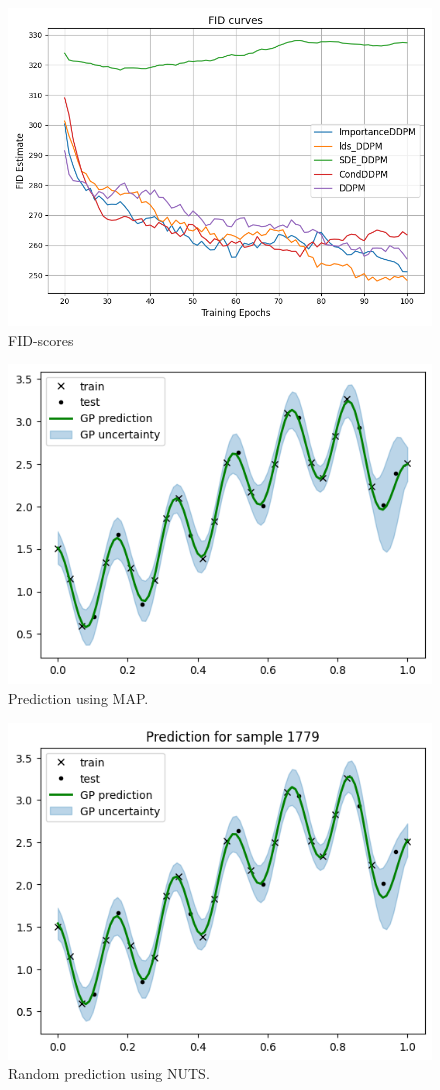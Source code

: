 \begin{figure}[H]
    \centering
    \includegraphics[width=0.9\linewidth]{./figures/FID.png}
    \caption{FID-scores}
    \label{fig:ddpm:fid}
\end{figure}






\begin{figure}[H]
  \centering
  \includegraphics[width=.65\textwidth]{./figures/map_pred.png}
  \caption{
    Prediction using MAP.
  }
  \label{fig:gp:map:pred}
\end{figure}
%
\begin{figure}[H]
  \centering
  \includegraphics[width=.65\textwidth]{./figures/nuts_pred.png}
  \caption{
    Random prediction using NUTS.
  }
  \label{fig:gp:nuts:pred}
\end{figure}

